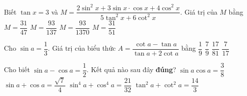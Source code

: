 \begin{ex}%
	Biết $\tan x=3$ và $M=\dfrac{2\sin ^2x+3\sin  x \cdot \cos x+4\cos ^2x}{5\tan ^2x+6\cot ^2x}$. Giá trị của $M$ bằng
	\choice 
		 {$M=\dfrac{31}{47}$}
		 {$M=\dfrac{93}{137}$}
		 {\True $M=\dfrac{93}{1370}$}
		 {$M=\dfrac{31}{51}$}
\end{ex}

\begin{ex}%
	Cho $\sin a=\dfrac{1}{3}$. Giá trị của biểu thức $A=\dfrac{\cot a-\tan  a}{\tan a+2\cot a}$ bằng
	\choice 
		{$\dfrac{1}{9}$} 
		 {$\dfrac{7}{9}$}
		 {$\dfrac{17}{81}$}
		{\True $\dfrac{7}{17}$} 
\end{ex}

\begin{ex}%
	Cho biết  $\sin a-\cos a=\dfrac{1}{2}$. Kết quả nào sau đây \textbf{đúng}?
	 \choice
		{\True  $\sin a\cos a=\dfrac{3}{8}$}
		 {$\sin a+\cos a=\dfrac{\sqrt{7}}{4}$}
		 {$\sin^4a+\cos^4a=\dfrac{21}{32}$}
		 {$\tan ^2a+\cot ^2a=\dfrac{14}{3}$}
\end{ex}

